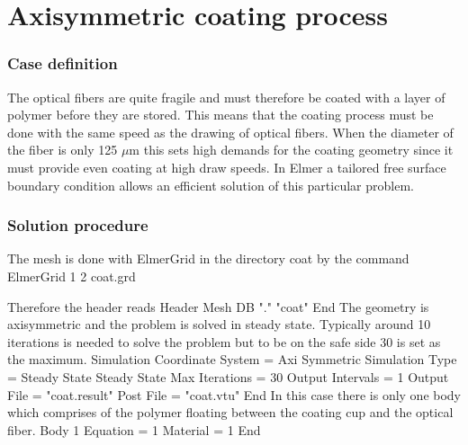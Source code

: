 \chapter{Axisymmetric coating process}


\subsection*{Case definition}

The optical fibers are quite fragile and must therefore be coated with
a layer of polymer before they are stored.  This means that the
coating process must be done with the same speed as the drawing of
optical fibers.  When the diameter of the fiber is only 125 $\mu$m
this sets high demands for the coating geometry since it must provide
even coating at high draw speeds. In Elmer a tailored free surface
boundary condition allows an efficient solution of this particular
problem.


\subsection*{Solution procedure}

The mesh is done with ElmerGrid in the directory coat by the command
%
\ttbegin
ElmerGrid 1 2 coat.grd
\ttend

Therefore the header reads 
\ttbegin
Header
  Mesh DB "." "coat"
End
\ttend
%
The geometry is axisymmetric and the problem is solved in steady state. Typically around 10
iterations is needed to solve the problem but to be on the safe side 30 is set as the maximum.
\ttbegin
Simulation
  Coordinate System = Axi Symmetric
  Simulation Type = Steady State
  Steady State Max Iterations = 30
  Output Intervals = 1
  Output File = "coat.result"
  Post File = "coat.vtu"
End
\ttend
%
In this case there is only one body which comprises of the polymer 
floating between the coating cup and the optical fiber.
\ttbegin
Body 1
  Equation = 1
  Material = 1
End
\ttend

